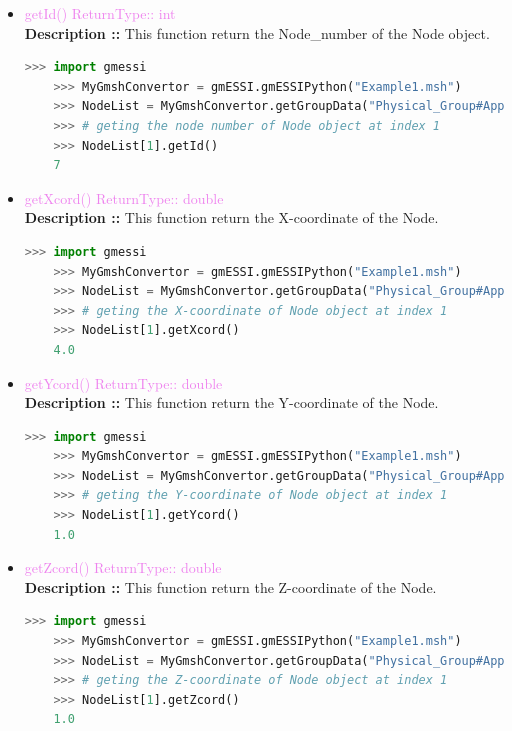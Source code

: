 \documentclass[11pt]{article}
\begin{document}
\begin{itemize}

    \item \textcolor{violet}{getId() \hfill {ReturnType:: int}} \\
    \textbf{Description ::} This function return the Node\_number of the Node object. 
    \begin{lstlisting}[language=Python]
    >>> import gmessi
    >>> MyGmshConvertor = gmESSI.gmESSIPython("Example1.msh")
    >>> NodeList = MyGmshConvertor.getGroupData("Physical_Group#ApplyForce").NodeList
    >>> # geting the node number of Node object at index 1    
    >>> NodeList[1].getId()
    7
    \end{lstlisting} 

    \item \textcolor{violet}{getXcord() \hfill {ReturnType:: double}} \\
    \textbf{Description ::} This function return the X-coordinate of the Node. 
    \begin{lstlisting}[language=Python]
    >>> import gmessi
    >>> MyGmshConvertor = gmESSI.gmESSIPython("Example1.msh")
    >>> NodeList = MyGmshConvertor.getGroupData("Physical_Group#ApplyForce").NodeList
    >>> # geting the X-coordinate of Node object at index 1
    >>> NodeList[1].getXcord()
    4.0
    \end{lstlisting} 

    \item \textcolor{violet}{getYcord() \hfill {ReturnType:: double}} \\
    \textbf{Description ::} This function return the Y-coordinate of the Node.  
    \begin{lstlisting}[language=Python]
    >>> import gmessi
    >>> MyGmshConvertor = gmESSI.gmESSIPython("Example1.msh")
    >>> NodeList = MyGmshConvertor.getGroupData("Physical_Group#ApplyForce").NodeList
    >>> # geting the Y-coordinate of Node object at index 1
    >>> NodeList[1].getYcord()
    1.0
    \end{lstlisting} 

    \item \textcolor{violet}{getZcord() \hfill {ReturnType:: double}} \\
    \textbf{Description ::} This function return the Z-coordinate of the Node. 
    \begin{lstlisting}[language=Python]
    >>> import gmessi
    >>> MyGmshConvertor = gmESSI.gmESSIPython("Example1.msh")
    >>> NodeList = MyGmshConvertor.getGroupData("Physical_Group#ApplyForce").NodeList
    >>> # geting the Z-coordinate of Node object at index 1
    >>> NodeList[1].getZcord()
    1.0
    \end{lstlisting} 

\end{itemize}
\end{document}
